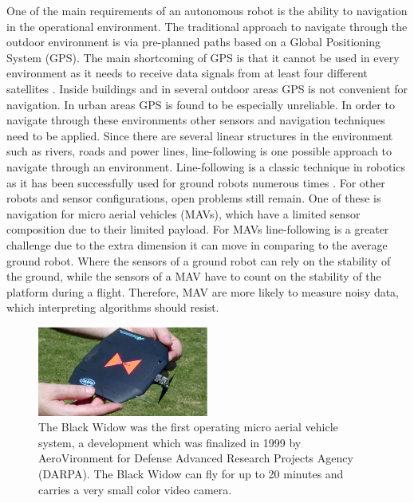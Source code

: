 \documentclass[a4paper]{article}
\begin{document}
One of the main requirements of an autonomous robot is the ability to navigation in the operational environment. The traditional approach to navigate through the outdoor environment is via pre-planned paths based on a Global Positioning System (GPS). The main shortcoming of GPS is that it cannot be used in every environment as it needs to receive data signals from at least four different satellites \cite{Bajaj2002}. Inside buildings and in several outdoor areas GPS is not convenient for navigation. In urban areas GPS is found to be especially unreliable. In order to navigate through these environments other sensors and navigation techniques need to be applied. Since there are several linear structures in the environment such as rivers, roads and power lines, line-following is one possible approach to navigate through an environment. Line-following is a classic technique in robotics as it has been successfully used for ground robots numerous times \cite{Sampei1995, Dupuis2006}. For other robots and sensor configurations, open problems still remain. One of these is navigation for micro aerial vehicles (MAVs), which have a limited sensor composition due to their limited payload. For MAVs line-following is a greater challenge due to the extra dimension it can move in comparing to the average ground robot. Where the sensors of a ground robot can rely on the stability of the ground, while the sensors of a MAV have to count on the stability of the platform during a flight. Therefore, MAV are more likely to measure noisy data, which interpreting algorithms should resist.

\begin{figure}[!ht]
	\centering
	\includegraphics[width=0.5\textwidth]{images/blackwidow.eps}
	\caption{The Black Widow \cite{Grasmeyer2001} was the first operating micro aerial vehicle system, a development which was finalized in 1999 by AeroVironment for Defense Advanced Research Projects Agency (DARPA). The Black Widow can fly for up to 20 minutes and carries a very small color video camera.}
	\label{blackwidow}
\end{figure}
\end{document}
